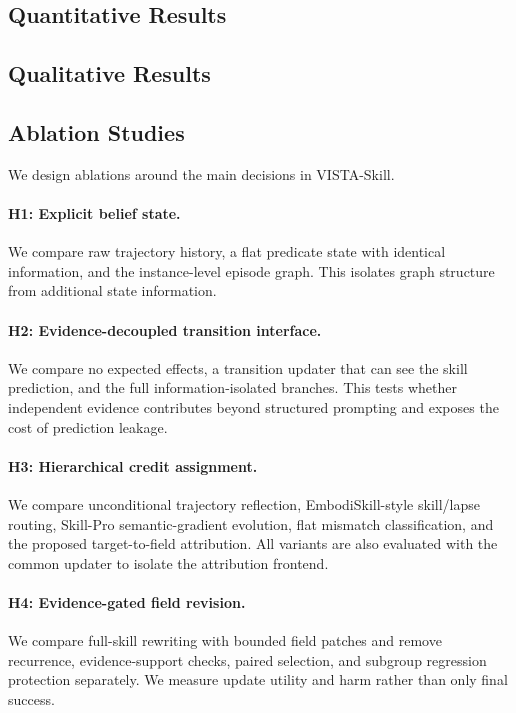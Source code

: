 \subsection{Quantitative Results}
\label{sec:quantitative_results}


\subsection{Qualitative Results}
\label{sec:qualitative_results}


\subsection{Ablation Studies}
\label{sec:ablation_studies}

We design ablations around the main decisions in VISTA-Skill.

\paragraph{H1: Explicit belief state.}
We compare raw trajectory history, a flat predicate state with identical information, and the instance-level episode graph. This isolates graph structure from additional state information.

\paragraph{H2: Evidence-decoupled transition interface.}
We compare no expected effects, a transition updater that can see the skill prediction, and the full information-isolated branches. This tests whether independent evidence contributes beyond structured prompting and exposes the cost of prediction leakage.

\paragraph{H3: Hierarchical credit assignment.}
We compare unconditional trajectory reflection, EmbodiSkill-style skill/lapse routing, Skill-Pro semantic-gradient evolution, flat mismatch classification, and the proposed target-to-field attribution. All variants are also evaluated with the common updater to isolate the attribution frontend.

\paragraph{H4: Evidence-gated field revision.}
We compare full-skill rewriting with bounded field patches and remove recurrence, evidence-support checks, paired selection, and subgroup regression protection separately. We measure update utility and harm rather than only final success.

